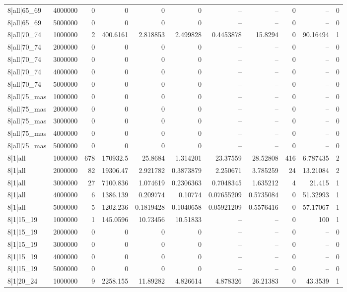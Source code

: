 \begin{tabular}{lrrrrrrrrrr}
8|all|65\_69 & 4000000 & 0 & 0 & 0 & 0 & -- & -- & 0 & -- & 0 \\
8|all|65\_69 & 5000000 & 0 & 0 & 0 & 0 & -- & -- & 0 & -- & 0 \\
8|all|70\_74 & 1000000 & 2 & 400.6161 & 2.818853 & 2.499828 & 0.4453878 & 15.8294 & 0 & 90.16494 & 1 \\
8|all|70\_74 & 2000000 & 0 & 0 & 0 & 0 & -- & -- & 0 & -- & 0 \\
8|all|70\_74 & 3000000 & 0 & 0 & 0 & 0 & -- & -- & 0 & -- & 0 \\
8|all|70\_74 & 4000000 & 0 & 0 & 0 & 0 & -- & -- & 0 & -- & 0 \\
8|all|70\_74 & 5000000 & 0 & 0 & 0 & 0 & -- & -- & 0 & -- & 0 \\
8|all|75\_mas & 1000000 & 0 & 0 & 0 & 0 & -- & -- & 0 & -- & 0 \\
8|all|75\_mas & 2000000 & 0 & 0 & 0 & 0 & -- & -- & 0 & -- & 0 \\
8|all|75\_mas & 3000000 & 0 & 0 & 0 & 0 & -- & -- & 0 & -- & 0 \\
8|all|75\_mas & 4000000 & 0 & 0 & 0 & 0 & -- & -- & 0 & -- & 0 \\
8|all|75\_mas & 5000000 & 0 & 0 & 0 & 0 & -- & -- & 0 & -- & 0 \\
8|1|all & 1000000 & 678 & 170932.5 & 25.8684 & 1.314201 & 23.37559 & 28.52808 & 416 & 6.787435 & 2 \\
8|1|all & 2000000 & 82 & 19306.47 & 2.921782 & 0.3873879 & 2.250671 & 3.785259 & 24 & 13.21084 & 2 \\
8|1|all & 3000000 & 27 & 7100.836 & 1.074619 & 0.2306363 & 0.7048345 & 1.635212 & 4 & 21.415 & 1 \\
8|1|all & 4000000 & 6 & 1386.139 & 0.209774 & 0.10774 & 0.07655209 & 0.5735084 & 0 & 51.32993 & 1 \\
8|1|all & 5000000 & 5 & 1202.236 & 0.1819428 & 0.1040658 & 0.05921209 & 0.5576416 & 0 & 57.17067 & 1 \\
8|1|15\_19 & 1000000 & 1 & 145.0596 & 10.73456 & 10.51833 & -- & -- & 0 & 100 & 1 \\
8|1|15\_19 & 2000000 & 0 & 0 & 0 & 0 & -- & -- & 0 & -- & 0 \\
8|1|15\_19 & 3000000 & 0 & 0 & 0 & 0 & -- & -- & 0 & -- & 0 \\
8|1|15\_19 & 4000000 & 0 & 0 & 0 & 0 & -- & -- & 0 & -- & 0 \\
8|1|15\_19 & 5000000 & 0 & 0 & 0 & 0 & -- & -- & 0 & -- & 0 \\
8|1|20\_24 & 1000000 & 9 & 2258.155 & 11.89282 & 4.826614 & 4.878326 & 26.21383 & 0 & 43.3539 & 1 \\

\end{tabular}
